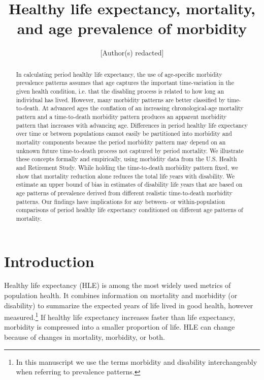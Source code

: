 \documentclass[12pt,oneside,a4paper]{article} %
\begin{document}
\title{Healthy life expectancy, mortality, and age prevalence of morbidity}

\author{[Author(s) redacted]}


\maketitle

\begin{abstract}
In calculating period healthy life expectancy, the use of age-specific
morbidity prevalence patterns assumes that age captures the important
time-variation in the given health condition, i.e. that the disabling process is related to how long an individual has lived. However, many morbidity patterns are better classified by time-to-death. At advanced ages the conflation of an increasing chronological-age mortality pattern and a time-to-death morbidity pattern produces an apparent morbidity pattern that increases with advancing age. Differences in period healthy life expectancy over time or between populations cannot easily be partitioned into morbidity and mortality components because the period morbidity pattern may depend on an unknown future time-to-death process not captured by period mortality. We illustrate these concepts formally and empirically, using morbidity data from the U.S. Health and Retirement Study.
While holding the time-to-death morbidity pattern fixed, we show that mortality
reduction alone reduces the total life years with disability. We estimate an
upper bound of bias in estimates of disability life years that are based on age
patterns of prevalence derived from different realistic time-to-death morbidity
patterns.
Our findings have implications for any between- or within-population
comparisons of period healthy life expectancy conditioned on different age patterns of mortality.
\end{abstract}

\section{Introduction}

Healthy life expectancy (HLE) is among the most widely used metrics of
population health. It combines information on mortality and morbidity (or disability) to
summarize the expected years of life lived in good health, however measured.\footnote{In this manuscript we use the terms morbidity and disability interchangeably when referring to prevalence patterns.} If
healthy life expectancy increases faster than life expectancy, morbidity is
compressed into a smaller proportion of life. HLE can change because of changes in mortality, morbidity, or both.
\end{document}
